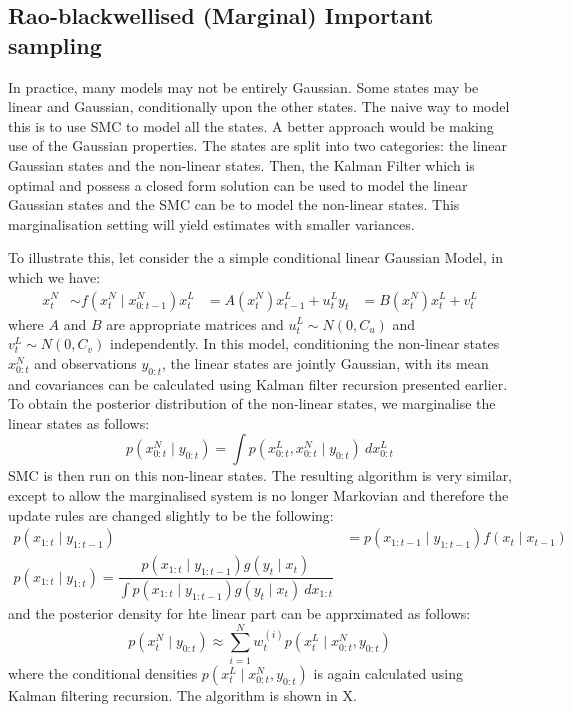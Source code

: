 \subsection{Rao-blackwellised (Marginal) Important sampling}
In practice, many models may not be entirely Gaussian. Some states may be linear and Gaussian, conditionally upon the other states. The naive way to model this is to use SMC to model all the states. A better approach would be making use of the Gaussian properties. The states are split into two categories: the linear Gaussian states and the non-linear states. Then, the Kalman Filter which is optimal and possess a closed form solution can be used to model the linear Gaussian states and the SMC can be to model the non-linear states. This marginalisation setting will yield estimates with smaller variances. 

To illustrate this, let consider the a simple conditional linear Gaussian Model, in which we have:
\begin{align}
  x^N_t  &\sim f(x^N_t \mid x^N _{0:t-1})
  x^L_t  &= A(x^N_t) x^L_{t-1} + u^L_t
  y_t    &= B(x^N_t) x^L_t + v^L_t
\end{align}
where $A$ and $B$ are appropriate matrices and $u^L_t \sim N(0, C_u)$ and $v^L_t\sim N(0, C_v)$ independently. In this model, conditioning the non-linear states $x^N_{0:t}$ and observations $y_{0:t}$, the linear states are jointly Gaussian, with its mean and covariances can be calculated using Kalman filter recursion presented earlier. To obtain the posterior distribution of the non-linear states, we marginalise the linear states as follows:
\begin{equation}
  p(x^N_{0:t} \mid y_{0:t}) = \int p(x^L_{0:t}, x^N_{0:t} \mid y_{0:t})~dx^L_{0:t}
\end{equation}
SMC is then run on this non-linear states. The resulting algorithm is very similar, except to allow the marginalised system is no longer Markovian and therefore the update rules are changed slightly to be the following:
\begin{align}
  p(x_{1:t} \mid y_{1:t-1}) &= p(x_{1:t-1} \mid y_{1:t-1})f(x_t \mid x_{t-1}) \nonumber \\
  p(x_{1:t} \mid y_{1:t}) = \dfrac{p(x_{1:t} \mid y_{1:t-1}) g(y_t \mid x_t)}{\int p(x_{1:t} \mid y_{1:t-1}) g(y_t \mid x_t)~dx_{1:t}}
\end{align}
and the posterior density for hte linear part can be apprximated as follows:
\begin{equation}
  p(x^N_t \mid y_{0:t}) \approx \sum^N_{i=1} w^{(i)}_t p(x^L_t \mid x^N_{0:t}, y_{0:t})
\end{equation}
where the conditional densities $p(x^L_t \mid x^N_{0:t}, y_{0:t})$ is again calculated using Kalman filtering recursion. The algorithm is shown in X.

